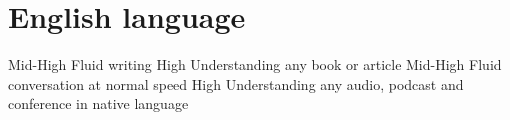 \documentclass[draft,color,12pt,letterpaper,sans]{moderncv}
\begin{document}
\newpage

\section{English language}
{Mid-High}
{Fluid writing}
{High}
{Understanding any book or article}
{Mid-High}
{Fluid conversation at normal speed}
{High}
{Understanding any audio, podcast and conference in native language}

\end{document}

